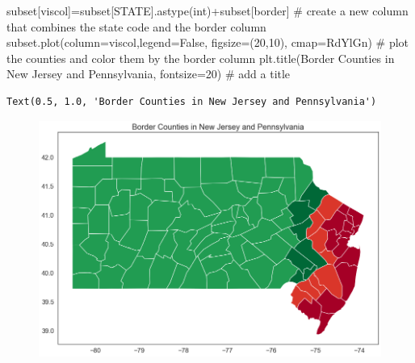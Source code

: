 \documentclass[
  letterpaper,
  DIV=11,
  numbers=noendperiod]{scrreprt}
\newenvironment{Shaded}{\begin{snugshade}}{\end{snugshade}}
\newcommand{\BuiltInTok}[1]{\textcolor[rgb]{0.00,0.23,0.31}{#1}}
\newcommand{\CommentTok}[1]{\textcolor[rgb]{0.37,0.37,0.37}{#1}}
\newcommand{\DecValTok}[1]{\textcolor[rgb]{0.68,0.00,0.00}{#1}}
\newcommand{\NormalTok}[1]{\textcolor[rgb]{0.00,0.23,0.31}{#1}}
\newcommand{\OperatorTok}[1]{\textcolor[rgb]{0.37,0.37,0.37}{#1}}
\newcommand{\StringTok}[1]{\textcolor[rgb]{0.13,0.47,0.30}{#1}}
\newcommand{\VariableTok}[1]{\textcolor[rgb]{0.07,0.07,0.07}{#1}}
\begin{document}
\begin{Shaded}
\begin{Highlighting}[]
\NormalTok{subset[}\StringTok{\textquotesingle{}viscol\textquotesingle{}}\NormalTok{]}\OperatorTok{=}\NormalTok{subset[}\StringTok{\textquotesingle{}STATE\textquotesingle{}}\NormalTok{].astype(}\BuiltInTok{int}\NormalTok{)}\OperatorTok{+}\NormalTok{subset[}\StringTok{\textquotesingle{}border\textquotesingle{}}\NormalTok{] }\CommentTok{\# create a new column that combines the state code and the border column}
\NormalTok{subset.plot(column}\OperatorTok{=}\StringTok{\textquotesingle{}viscol\textquotesingle{}}\NormalTok{,legend}\OperatorTok{=}\VariableTok{False}\NormalTok{, figsize}\OperatorTok{=}\NormalTok{(}\DecValTok{20}\NormalTok{,}\DecValTok{10}\NormalTok{), cmap}\OperatorTok{=}\StringTok{\textquotesingle{}RdYlGn\textquotesingle{}}\NormalTok{) }\CommentTok{\# plot the counties and color them by the border column}
\NormalTok{plt.title(}\StringTok{\textquotesingle{}Border Counties in New Jersey and Pennsylvania\textquotesingle{}}\NormalTok{, fontsize}\OperatorTok{=}\DecValTok{20}\NormalTok{) }\CommentTok{\# add a title}
\end{Highlighting}
\end{Shaded}

\begin{verbatim}
Text(0.5, 1.0, 'Border Counties in New Jersey and Pennsylvania')
\end{verbatim}

\begin{figure}[H]

{\centering \includegraphics{notebooks/W09. Causal Inference_files/figure-pdf/cell-6-output-2.png}

}

\end{figure}
\end{document}

